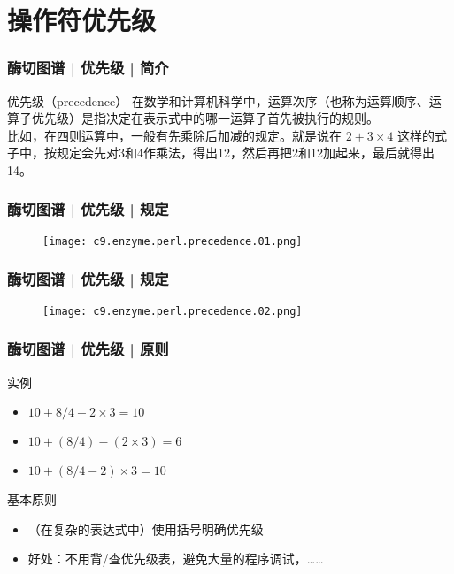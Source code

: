 \section{操作符优先级}
\begin{frame}
  \frametitle{酶切图谱 | 优先级 | 简介}
  \begin{block}{优先级（precedence）}
    在数学和计算机科学中，运算次序（也称为运算顺序、运算子优先级）是指决定在表示式中的哪一运算子首先被执行的规则。\\
    \vspace{1em}
    比如，在四则运算中，一般有先乘除后加减的规定。就是说在 $2 + 3 \times 4 $ 这样的式子中，按规定会先对3和4作乘法，得出12，然后再把2和12加起来，最后就得出14。
  \end{block}
\end{frame}

\begin{frame}
  \frametitle{酶切图谱 | 优先级 | 规定}
  \begin{figure}
    \centering
    \texttt{[image: c9.enzyme.perl.precedence.01.png]}
  \end{figure}
\end{frame}

\begin{frame}
  \frametitle{酶切图谱 | 优先级 | 规定}
  \begin{figure}
    \centering
    \texttt{[image: c9.enzyme.perl.precedence.02.png]}
  \end{figure}
\end{frame}

\begin{frame}
  \frametitle{酶切图谱 | 优先级 | 原则}
  \begin{block}{实例}
    \begin{itemize}
      \item $10 + 8 / 4 - 2 \times 3 = 10$
      \item $10 + (8 / 4) - (2 \times 3) = 6$
      \item $10 + (8 / 4 - 2) \times 3 = 10$
    \end{itemize}
  \end{block}
  \pause
  \begin{block}{\alert{基本原则}}
    \begin{itemize}
      \item （在复杂的表达式中）使用括号明确优先级
      \item 好处：不用背/查优先级表，避免大量的程序调试，……
    \end{itemize}
  \end{block}
\end{frame}

